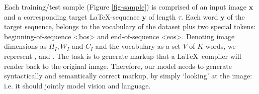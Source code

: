 \documentclass{article}
\begin{document}
Each training/test sample (Figure \ref{fig-sample}) is comprised of an input image  $\boldsymbol{x}$ and a corresponding target \LaTeX -sequence $\boldsymbol{y}$ of length $\tau$. Each word $\boldsymbol{y}$ of the target sequence, belongs to the vocabulary of the dataset plus two special tokens: beginning-of-sequence <bos> and end-of-sequence <eos>. %
Denoting image dimensions as $H_I, W_I$ and $C_I$ and the vocabulary as a set $V$ of $K$ words, we represent ,  and .
The task is to generate markup that a \LaTeX ~compiler will render back to the original image. Therefore, our model needs to generate syntactically and semantically correct markup, by simply `looking' at the image: i.e. it should jointly model vision and language.
\end{document}
